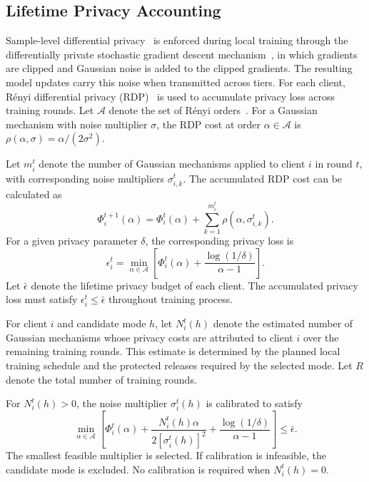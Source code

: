 \documentclass[5p,times]{elsarticle}
\theoremstyle{plain}
\theoremstyle{definition}
\theoremstyle{remark}
\begin{document}
\subsection{Lifetime Privacy Accounting}
\label{sec:privacy_model}

Sample-level differential privacy~\cite{dwork2014the}
is enforced during local training through the
differentially private stochastic gradient descent
mechanism~\cite{abadi2016deep}, in which gradients
are clipped and Gaussian noise is added to the
clipped gradients. The resulting model updates
carry this noise when transmitted across tiers. For each client,
R\'enyi differential privacy (RDP)~\cite{mironov2017renyi}
is used to accumulate privacy loss across
training rounds. Let \(\mathcal A\) denote
the set of R\'enyi orders~\cite{vanerven2014renyi}. 
For a Gaussian
mechanism with noise multiplier \(\sigma\),
the RDP cost at order \(\alpha\in\mathcal A\)
is \(\rho(\alpha,\sigma)=\alpha/(2\sigma^2)\).

Let \(m_i^t\) denote the number of Gaussian
mechanisms applied to client \(i\) in round
\(t\), with corresponding noise multipliers
\(\sigma_{i,k}^t\).
The accumulated RDP cost can be calculated as
\begin{equation}
\Phi_i^{t+1}(\alpha)
=
\Phi_i^t(\alpha)
+
\sum_{k=1}^{m_i^t}
\rho(\alpha,\sigma_{i,k}^t).
\label{eq:rdp_update}
\end{equation}
For a given privacy parameter \(\delta\),
the corresponding privacy loss is
\begin{equation}
\epsilon_i^t
=
\min_{\alpha\in\mathcal A}
\left[
\Phi_i^t(\alpha)
+
\frac{\log(1/\delta)}{\alpha-1}
\right].
\label{eq:rdp_to_dp}
\end{equation}
Let \(\bar{\epsilon}\) denote the lifetime
privacy budget of each client. The accumulated
privacy loss must satisfy
\(\epsilon_i^t\leq\bar{\epsilon}\)
throughout training process.

For client \(i\) and candidate mode \(h\), let
\(N_i^t(h)\) denote the estimated number of Gaussian
mechanisms whose privacy costs are attributed to
client \(i\) over the remaining training rounds.
This estimate is determined by the planned local
training schedule and the protected releases
required by the selected mode. Let \(R\) denote
the total number of training rounds.

For \(N_i^t(h)>0\), the noise multiplier
\(\sigma_i^t(h)\) is calibrated to satisfy
\begin{equation}
\min_{\alpha\in\mathcal A}
\left[
\Phi_i^t(\alpha)
+
\frac{N_i^t(h)\alpha}
{2[\sigma_i^t(h)]^2}
+
\frac{\log(1/\delta)}{\alpha-1}
\right]
\leq\bar{\epsilon}.
\label{eq:noise_calibration}
\end{equation}
The smallest feasible multiplier is selected.
If calibration is infeasible, the candidate
mode is excluded. No calibration is required
when \(N_i^t(h)=0\).
\end{document}
